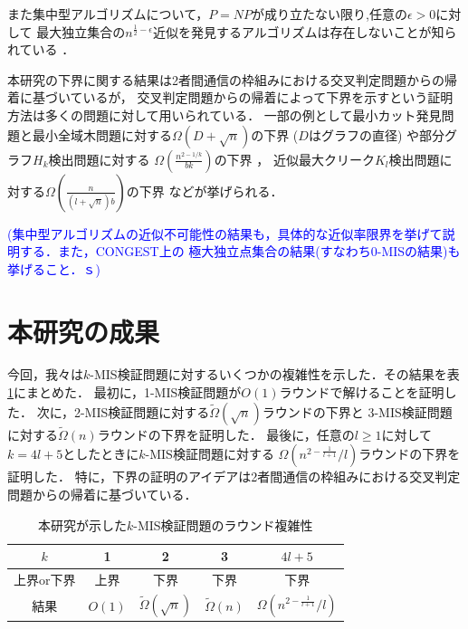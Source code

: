 \documentclass[12pt]{thesis}
\newcommand{\Izumi}[1]{\textcolor{blue}{(#1)}}
\theoremstyle{definition}
\begin{document}
また集中型アルゴリズムについて，$P = NP$が成り立たない限り,任意の$\epsilon > 0$に対して
最大独立集合の$n^{\frac{1}{2} - \epsilon}$近似を発見するアルゴリズムは存在しないことが知られている \cite{haastad1999clique}．
 
本研究の下界に関する結果は2者間通信の枠組みにおける交叉判定問題からの帰着に基づいているが，
交叉判定問題からの帰着によって下界を示すという証明方法は多くの問題に対して用いられている．
一部の例として最小カット発見問題と最小全域木問題に対する$\Omega (D + \sqrt{n})$の下界
($D$はグラフの直径) \cite{sarma2012distributed}や部分グラフ$H_{k}$検出問題に対する
$\Omega \left(\frac{n^{2 - 1/k}}{bk}\right)$の下界 \cite{fischer2018possibilities}，
近似最大クリーク$K_{l}$検出問題に対する$\Omega \left(\frac{n}{(l + \sqrt{n})b}\right)$の下界
 \cite{czumaj2020detecting}などが挙げられる．

\Izumi{集中型アルゴリズムの近似不可能性の結果も，具体的な近似率限界を挙げて説明する．また，CONGEST上の
極大独立点集合の結果(すなわち0-MISの結果)も挙げること．ｓ}

\section{本研究の成果}
今回，我々は$k$-MIS検証問題に対するいくつかの複雑性を示した．その結果を表\ref{tab: k-MIS}にまとめた．
最初に，1-MIS検証問題が$O(1)$ラウンドで解けることを証明した．
次に，2-MIS検証問題に対する$\tilde{\Omega} (\sqrt{n})$ラウンドの下界と
3-MIS検証問題に対する$\tilde{\Omega} (n)$ラウンドの下界を証明した．
最後に，任意の$l \geq 1$に対して$k = 4l + 5$としたときに$k$-MIS検証問題に対する
$\Omega\left(n^{2 - \frac{1}{l+1}}/l\right)$ラウンドの下界を証明した．
特に，下界の証明のアイデアは2者間通信の枠組みにおける交叉判定問題からの帰着に基づいている．

\begin{table}[htb]
  \begin{center}
    \caption{本研究が示した$k$-MIS検証問題のラウンド複雑性}
    \begin{tabular}{|c||c|c|c|c|} \hline
      $k$ & 1 & 2 & 3 & $4l + 5$ \\ \hline
      上界or下界 & 上界 & 下界 & 下界 & 下界 \\ \hline
      結果 & $O(1)$ & $\tilde{\Omega} (\sqrt{n})$ & $\tilde{\Omega} (n)$ & $\Omega\left(n^{2 - \frac{1}{l+1}}/l\right)$ \\ \hline
    \end{tabular}
    \label{tab: k-MIS}
  \end{center}
\end{table}
\end{document}
